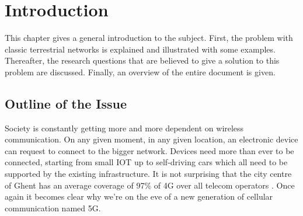 \chapter{Introduction}
\label{chap:intro}

This chapter gives a general introduction to the subject. First, the problem with 
classic terrestrial networks is explained and illustrated with some examples. Thereafter, 
the research questions that are believed to give a solution to this problem are discussed.
Finally, an overview of the entire document is given.

\section{Outline of the Issue} %
\label{sec:issue}

Society is constantly getting more and more dependent on wireless communication. 
On any given moment, in any given location, an electronic device
can request to connect to the bigger network. Devices need more than ever to be connected, 
starting from small \gls{IOT} up to self-driving cars
which all need to be supported by the existing infrastructure. 
It is not surprising that the city centre of Ghent has an average coverage of 97\% of 4G over all telecom operators
\cite{testaankoop}. Once again it becomes clear why we're on the eve of a new generation of cellular communication named 5G. 

